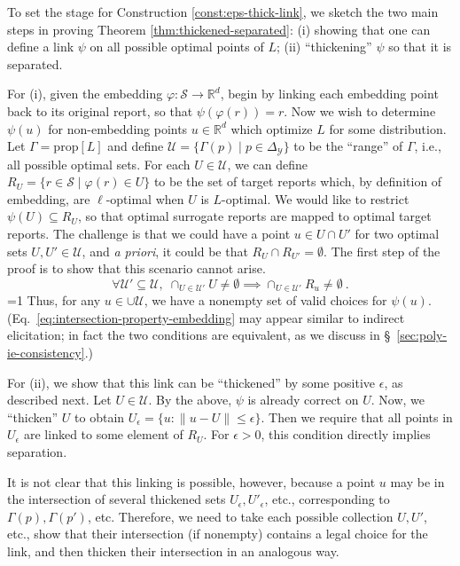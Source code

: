 \documentclass[11pt]{article}
\newcommand{\Comments}{1}
\newcommand{\mytodo}[2]{\ifnum\Comments=1%
  \todo[linecolor=#1!80!black,backgroundcolor=#1,bordercolor=#1!80!black]{#2}\fi}
\newcommand{\jessiet}[1]{\mytodo{teal!20!white}{JF: #1}}
\newcommand{\reals}{\mathbb{R}}
\newcommand{\prop}[1]{\mathrm{prop}[#1]}
\newcommand{\simplex}{\Delta_\Y}
\newcommand{\Sc}{\mathcal{S}}
\newcommand{\U}{\mathcal{U}}
\newcommand{\Y}{\mathcal{Y}}
\begin{document}
To set the stage for Construction \ref{const:eps-thick-link}, we sketch the two main steps in proving Theorem \ref{thm:thickened-separated}: (i) showing that one can define a link $\psi$ on all possible optimal points of $L$; (ii) ``thickening'' $\psi$ so that it is separated.

For (i), given the embedding $\varphi: \Sc\to\reals^d$, begin by linking each embedding point back to its original report, so that $\psi(\varphi(r)) = r$.
Now we wish to determine $\psi(u)$ for non-embedding points $u\in\reals^d$ which optimize $L$ for some distribution.
Let $\Gamma = \prop L$ and define $\U = \{\Gamma(p) \mid p\in\simplex\}$ to be the ``range'' of $\Gamma$, i.e., all possible optimal sets.
For each $U\in\U$, we can define $R_U = \{ r\in\Sc \mid \varphi(r) \in U\}$ to be the set of target reports which, by definition of embedding, are $\ell$-optimal when $U$ is $L$-optimal.
We would like to restrict $\psi(U) \subseteq R_U$, so that optimal surrogate reports are mapped to optimal target reports.
The challenge is that we could have a point $u\in U\cap U'$ for two optimal sets $U,U'\in\U$, and \emph{a priori}, it could be that $R_U \cap R_{U'} = \emptyset$.
The first step of the proof is to show that this scenario cannot arise.
\begin{equation}
  \label{eq:intersection-property-embedding}
  \forall \U'\subseteq\U, \; \cap_{U\in\U'} U \neq \emptyset \implies \cap_{U\in\U'} R_u \neq \emptyset~.
\end{equation}
\jessiet{typo? $R_U$?}
\noindent
Thus, for any $u\in\cup\U$, we have a nonempty set of valid choices for $\psi(u)$.
(Eq.~\eqref{eq:intersection-property-embedding} may appear similar to indirect elicitation; in fact the two conditions are equivalent, as we discuss in \S~\ref{sec:poly-ie-consistency}.)

For (ii), we show that this link can be ``thickened'' by some positive $\epsilon$, as described next.
Let $U\in\U$.
By the above, $\psi$ is already correct on $U$.
Now, we ``thicken'' $U$ to obtain $U_{\epsilon} = \{u : \|u - U\| \leq \epsilon\}$.
Then we require that all points in $U_{\epsilon}$ are linked to some element of $R_U$.
For $\epsilon > 0$, this condition directly implies separation.

It is not clear that this linking is possible, however, because a point $u$ may be in the intersection of several thickened sets $U_{\epsilon}, U'_{\epsilon}$, etc., corresponding to $\Gamma(p), \Gamma(p')$, etc.
Therefore, we need to take each possible collection $U,U'$, etc., show that their intersection (if nonempty) contains a legal choice for the link, and then thicken their intersection in an analogous way.
\end{document}
